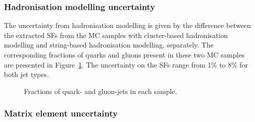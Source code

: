     
\FloatBarrier
\subsubsection{Hadronisation modelling uncertainty}
    The uncertainty from hadronisation modelling is given by the difference between the extracted SFs from the \sherpa MC samples with cluster-based hadronisation modelling and string-based hadronisation modelling, separately. The corresponding fractions of quarks and gluons present in these two MC samples are presented in Figure~\ref{fig:QG-had-Frac}. The uncertainty on the SFs range from 1\% to 8\% for both jet types.
    
    \begin{figure}[htb]
    	\centering
    	 \quad
    	\caption[]{
    		Fractions of quark- and gluon-jets in each \sherpa sample. %
    		\label{fig:QG-had-Frac}
    	}
    \end{figure}

\FloatBarrier

\subsubsection{Matrix element uncertainty}

